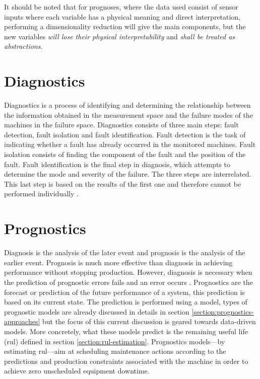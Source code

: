 It should be noted that for prognoses, where the data used consist of sensor inputs where each variable has a physical meaning and direct interpretation, performing a dimensionality reduction will give the main components, but the new variables \textit{will lose their physical interpretability} and \textit{shall be treated as abstractions}.


\section{Diagnostics}
Diagnostics is a process of identifying and determining the relationship between the information obtained in the measurement space and the failure modes of the machines in the failure space. Diagnostics consists of three main steps: fault detection, fault isolation and fault identification. Fault detection is the task of indicating whether a fault has already occurred in the monitored machines. Fault isolation consists of finding the component of the fault and the position of the fault. Fault identification is the final step in diagnosis, which attempts to determine the mode and severity of the failure. The three steps are interrelated. This last step is based on the results of the first one and therefore cannot be performed individually \cite{Lei2016b}.

\section{Prognostics}
Diagnosis is the analysis of the later event and prognosis is the analysis of the earlier event. Prognosis is much more effective than diagnosis in achieving performance without stopping production. However, diagnosis is necessary when the prediction of prognostic errors fails and an error occurs \cite{Jardine2006}.
Prognostics are the forecast or prediction of the future performance of a system, this prediction is based on its current state. The prediction is performed using a model, types of prognostic models are already discussed in details in section \ref{section:prognostics-approaches} but the focus of this current discussion is geared towards data-driven models. More concretely, what these models predict is the remaining useful life (\acrshort{rul}) defined in section \ref{section:rul-estimation}. Prognostics models---by estimating \acrshort{rul}---aim at scheduling maintenance actions according to the predictions and production constraints associated with the machine in order to achieve zero unscheduled equipment downtime.

